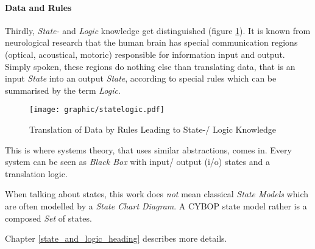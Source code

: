 %
%
%
%
%
%
%

\paragraph{Data and Rules}
\label{data_and_rules_heading}

Thirdly, \emph{State-} and \emph{Logic} knowledge get distinguished (figure
\ref{statelogic_figure}). It is known from neurological research that the human
brain has special communication regions (optical, acoustical, motoric)
responsible for information input and output. Simply spoken, these regions do
nothing else than translating data, that is an input \emph{State} into an
output \emph{State}, according to special rules which can be summarised by the
term \emph{Logic}.

\begin{figure}[ht]
    \begin{center}
        \texttt{[image: graphic/statelogic.pdf]}
        \caption{Translation of Data by Rules Leading to State-/ Logic Knowledge}
        \label{statelogic_figure}
    \end{center}
\end{figure}

This is where systems theory, that uses similar abstractions, comes in. Every
system can be seen as \emph{Black Box} with input/ output (i/o) states and a
translation logic.

When talking about states, this work does \emph{not} mean classical
\emph{State Models} which are often modelled by a \emph{State Chart Diagram}.
A CYBOP state model rather is a composed \emph{Set} of states.

Chapter \ref{state_and_logic_heading} describes more details.

